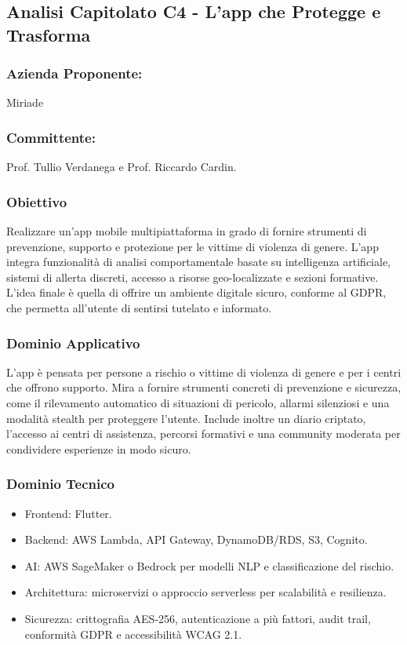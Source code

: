 \documentclass[a4paper,12pt]{article}
\begin{document}
\subsection{Analisi Capitolato C4 - L’app che Protegge e Trasforma}
\subsubsection*{Azienda Proponente:} Miriade
\subsubsection*{Committente:} Prof. Tullio Verdanega e Prof. Riccardo Cardin.
\subsubsection*{Obiettivo}
Realizzare un’app mobile multipiattaforma in grado di fornire strumenti di prevenzione, supporto e protezione per le vittime di violenza di genere.  
L’app integra funzionalità di analisi comportamentale basate su intelligenza artificiale, sistemi di allerta discreti, accesso a risorse geo-localizzate e sezioni formative.  
L’idea finale è quella di offrire un ambiente digitale sicuro, conforme al GDPR, che permetta all’utente di sentirsi tutelato e informato.

\subsubsection*{Dominio Applicativo}
L’app è pensata per persone a rischio o vittime di violenza di genere e per i centri che offrono supporto.  
Mira a fornire strumenti concreti di prevenzione e sicurezza, come il rilevamento automatico di situazioni di pericolo, allarmi silenziosi e una modalità stealth per proteggere l’utente.  
Include inoltre un diario criptato, l’accesso ai centri di assistenza, percorsi formativi e una community moderata per condividere esperienze in modo sicuro.


\subsubsection*{Dominio Tecnico}
\begin{itemize}[leftmargin=*]
    \item Frontend: Flutter.
    \item Backend: AWS Lambda, API Gateway, DynamoDB/RDS, S3, Cognito.
    \item AI: AWS SageMaker o Bedrock per modelli NLP e classificazione del rischio.
    \item Architettura: microservizi o approccio serverless per scalabilità e resilienza.
    \item Sicurezza: crittografia AES-256, autenticazione a più fattori, audit trail, conformità GDPR e accessibilità WCAG 2.1.
\end{itemize}
\end{document}
